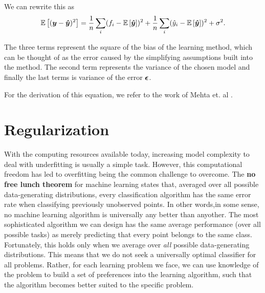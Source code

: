 We can rewrite this as 
$$\mathbb{E}\left[({\boldsymbol{y}}-{\boldsymbol{\hat{y}}})^2\right]=\frac{1}{n}\sum_i(f_i-\mathbb{E}\left[{\boldsymbol{\hat{y}}}\right])^2+\frac{1}{n}\sum_i(\hat{y}_i-\mathbb{E}\left[{\boldsymbol{\hat{y}}}\right])^2+\sigma^2.$$

The three terms represent the square of the bias of the learning
method, which can be thought of as the error caused by the simplifying
assumptions built into the method. The second term represents the
variance of the chosen model and finally the last terms is variance of
the error ${\boldsymbol{\epsilon}}$.

For the derivation of this equation, we refer to the work of Mehta et. al \cite{Mehta2019}.


\section{Regularization}\label{section:regularization}
With the computing resources available today, increasing model complexity to deal 
with underfitting is usually a simple task. However, this computational freedom 
has led to overfitting being the common challenge to overcome. 
The \textbf{no free lunch theorem} for machine learning \cite{Wolpert1997} states
that, averaged over all possible data-generating distributions, every classification
algorithm has the same error rate when classifying previously unobserved points.
In other words,in some sense, no machine learning algorithm is universally any better 
than anyother. The most sophisticated algorithm we can design has the same average
performance (over all possible tasks) as merely predicting that every point belongs
to the same class. Fortunately, this holds only when we average over \textit{all}
possible data-generating distributions\cite{Goodfellow-et-al-2016}. 
This means that we do not seek a universally optimal classifier for all problems.
Rather, for each learning problem we face, we can use knowledge of the problem to 
build a set of preferences into the learning algorithm, such that the algorithm 
becomes better suited to the specific problem.

